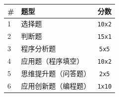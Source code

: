 \documentclass[11pt]{article}
\begin{document}
\begin{longtable}[]{@{}llc@{}}
\toprule
\# & 题型 & 分数 \\
\midrule
\endhead
1 & 选择题 & \texttt{10x2} \\
2 & 判断题 & \texttt{15x1} \\
3 & 程序分析题 & \texttt{5x5} \\
4 & 应用题（程序填空） & \texttt{10x2} \\
5 & 思维提升题（问答题） & \texttt{2x5} \\
6 & 应用创新题（编程题） & \texttt{1x10} \\
\bottomrule
\end{longtable}


    
    
    
\end{document}
